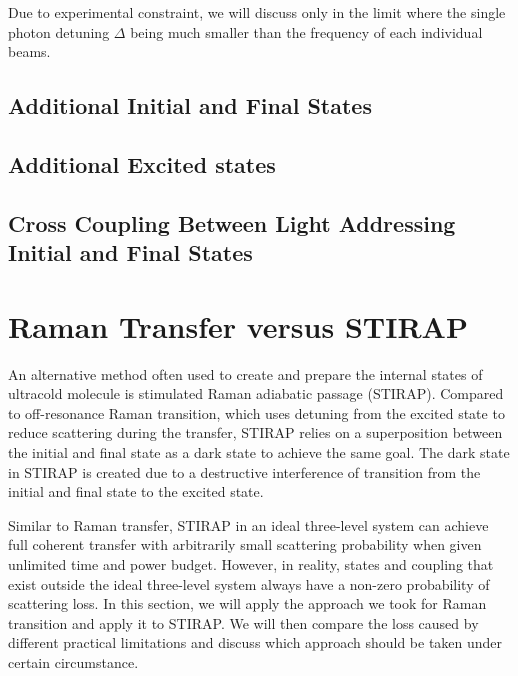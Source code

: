 \todo{}

Due to experimental constraint,
we will discuss only in the limit where the single photon detuning $\Delta$ being
much smaller than the frequency of each individual beams.

\subsection{Additional Initial and Final States}

\subsection{Additional Excited states}

\subsection{Cross Coupling Between Light Addressing Initial and Final States}


\section{Raman Transfer versus STIRAP}

An alternative method often used to create and prepare the internal states of ultracold molecule
is stimulated Raman adiabatic passage (STIRAP)\todo{\cite{}}.
Compared to off-resonance Raman transition, which uses detuning from the excited state
to reduce scattering during the transfer, STIRAP relies on a superposition between
the initial and final state as a dark state to achieve the same goal.
The dark state in STIRAP is created due to a destructive interference of transition
from the initial and final state to the excited state.

Similar to Raman transfer, STIRAP in an ideal three-level system can achieve
full coherent transfer with arbitrarily small scattering probability
when given unlimited time and power budget.
However, in reality, states and coupling that exist outside the ideal three-level system
always have a non-zero probability of scattering loss.
In this section, we will apply the approach we took for Raman transition
and apply it to STIRAP. We will then compare the loss caused by different practical limitations
and discuss which approach should be taken under certain circumstance.


